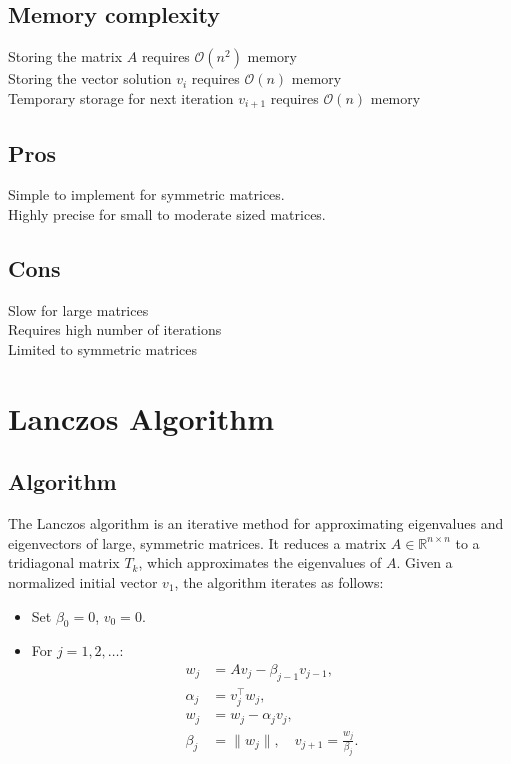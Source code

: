 \documentclass[final]{article}
\begin{document}
        \subsection{Memory complexity}
        Storing the matrix $A$ requires $\mathcal{O}(n^2)$ memory \\
        Storing the vector solution $v_i$ requires $\mathcal{O}(n)$ memory \\
        Temporary storage for next iteration $v_{i+1}$ requires $\mathcal{O}(n)$ memory
         \subsection{Pros} 
        Simple to implement for symmetric matrices. \\
        Highly precise for small to moderate sized matrices. \\
        \subsection{Cons}
        Slow for large matrices \\
        Requires high number of iterations \\
        Limited to symmetric matrices
    \section{Lanczos Algorithm}
    \subsection{Algorithm}
The Lanczos algorithm is an iterative method for approximating eigenvalues and eigenvectors of large, symmetric matrices. It reduces a matrix $A \in \mathbb{R}^{n \times n}$ to a tridiagonal matrix $T_k$, which approximates the eigenvalues of $A$. Given a normalized initial vector $v_1$, the algorithm iterates as follows:

\begin{itemize}
    \item Set $\beta_0 = 0$, $v_0 = 0$.
    \item For $j = 1, 2, \dots$:
    \begin{align*}
        w_j &= A v_j - \beta_{j-1} v_{j-1}, \\
        \alpha_j &= v_j^\top w_j, \\
        w_j &= w_j - \alpha_j v_j, \\
        \beta_j &= \|w_j\|, \quad v_{j+1} = \frac{w_j}{\beta_j}.
    \end{align*}
\end{itemize}
\end{document}
